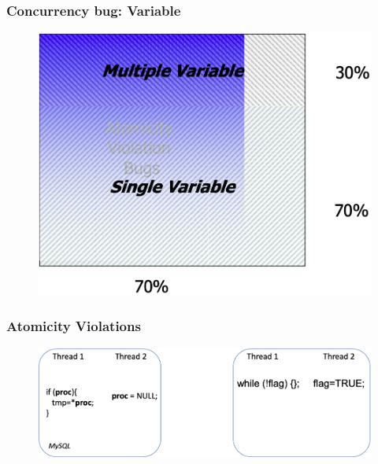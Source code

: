 % 
% 
% 
\begin{frame}[fragile]
    \frametitle{Concurrency bug: Variable}
    \begin{figure}
    \includegraphics[width=0.56\linewidth]{figs/root-cause-patterns-variable.png}
    \end{figure}
\end{frame}
% 
% 
\begin{frame}[fragile]
    \frametitle{Atomicity Violations}
    \begin{figure}
    \includegraphics[width=1.0\linewidth]{figs/atomic-region.png}
    \end{figure}
\end{frame}
% 
% 
% 
% 
